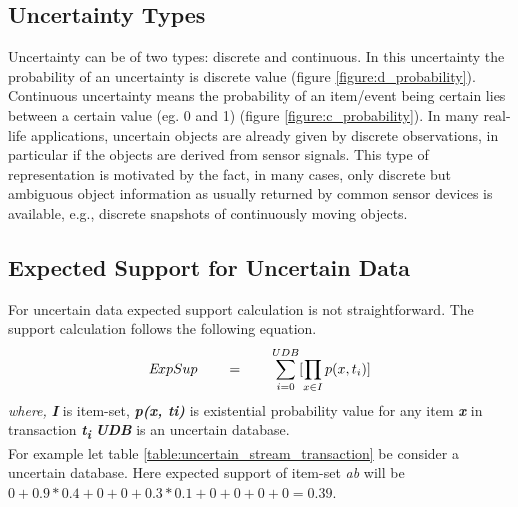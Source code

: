 \subsection{Uncertainty Types}
Uncertainty can be of two types: discrete and continuous. In this uncertainty the probability of an uncertainty is discrete value (figure \ref{figure:d_probability}). Continuous uncertainty means the probability of an item/event being certain lies between a certain value (eg. 0 and 1) (figure \ref{figure:c_probability}). In many real-life applications, uncertain objects are already given by discrete observations, in particular if the objects are derived from sensor signals. This type of representation is motivated by the fact, in many cases, only discrete but ambiguous object information as usually returned by common sensor devices is available, e.g., discrete snapshots of continuously moving objects.

\subsection{Expected Support for Uncertain Data}
For uncertain data expected support calculation is not straightforward. The support calculation follows the following equation.
    \begin{equation}
    \emph ExpSup \qquad = \qquad \sum_{i = 0}^{UDB} [\prod_{x \in I } p(x , t_i)]
    \end{equation}
\emph {where,}    \textbf{\emph {I}} is item-set,    \textbf{\emph { p(x, ti)}} is existential probability value for any item \textbf{\emph {x}} in transaction \textbf{\emph {t\textsubscript{i}}}     \textbf{\emph {UDB}} is an uncertain database.\\
For example let table \ref{table:uncertain_stream_transaction} be consider a uncertain database. Here expected support of item-set \emph{ab} will be $0+0.9*0.4+0+0+0.3*0.1+0+0+0+0=0.39$.

